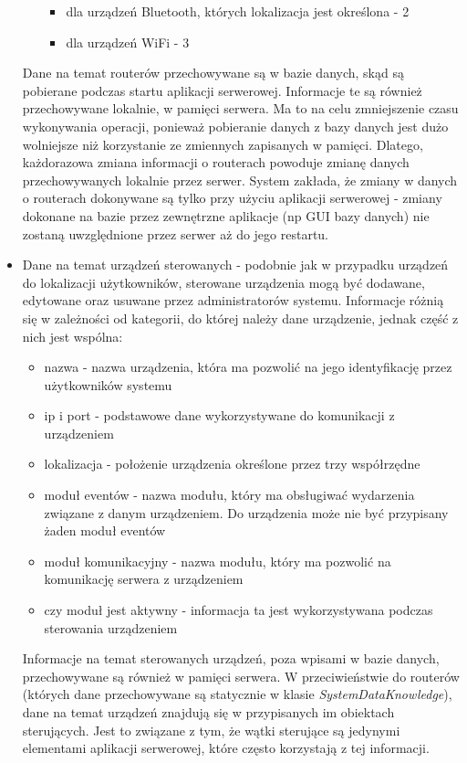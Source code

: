 \begin{itemize}
\begin{itemize}
\begin{itemize}
			\item dla urządzeń Bluetooth, których lokalizacja jest określona - 2
			\item dla urządzeń WiFi - 3
		\end{itemize}
	\end{itemize}
	Dane na temat routerów przechowywane są w bazie danych, skąd są pobierane podczas startu aplikacji serwerowej. Informacje te są również przechowywane lokalnie, w pamięci serwera. Ma to na celu zmniejszenie czasu wykonywania operacji, ponieważ pobieranie danych z bazy danych jest dużo wolniejsze niż korzystanie ze zmiennych zapisanych w pamięci. Dlatego, każdorazowa zmiana informacji o routerach powoduje zmianę danych przechowywanych lokalnie przez serwer. System zakłada, że zmiany w danych o routerach dokonywane są tylko przy użyciu aplikacji serwerowej - zmiany dokonane na bazie przez zewnętrzne aplikacje (np GUI bazy danych) nie zostaną uwzględnione przez serwer aż do jego restartu.
	\item Dane na temat urządzeń sterowanych - podobnie jak w przypadku urządzeń do lokalizacji użytkowników, sterowane urządzenia mogą być dodawane, edytowane oraz usuwane przez administratorów systemu. Informacje różnią się w zależności od kategorii, do której należy dane urządzenie, jednak część z nich jest wspólna:
	\begin{itemize}
		\item nazwa - nazwa urządzenia, która ma pozwolić na jego identyfikację przez użytkowników systemu
		\item ip i port - podstawowe dane wykorzystywane do komunikacji z urządzeniem
		\item lokalizacja - położenie urządzenia określone przez trzy współrzędne
		\item moduł eventów - nazwa modułu, który ma obsługiwać wydarzenia związane z danym urządzeniem. Do urządzenia może nie być przypisany żaden moduł eventów
		\item moduł komunikacyjny - nazwa modułu, który ma pozwolić na komunikację serwera z urządzeniem
		\item czy moduł jest aktywny - informacja ta jest wykorzystywana podczas sterowania urządzeniem 
	\end{itemize}
	Informacje na temat sterowanych urządzeń, poza wpisami w bazie danych, przechowywane są również w pamięci serwera. W przeciwieństwie do routerów (których dane przechowywane są statycznie w klasie \textit{SystemDataKnowledge}), dane na temat urządzeń znajdują się w przypisanych im obiektach sterujących. Jest to związane z tym, że wątki sterujące są jedynymi elementami aplikacji serwerowej, które często korzystają z tej informacji.\\

\end{itemize}
